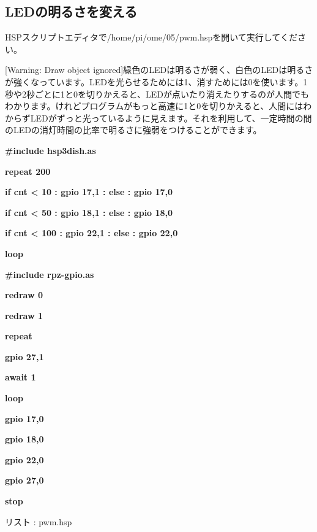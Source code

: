 \documentclass[a4paper,dvipdfmx]{jarticle}
\newcounter{List}
\renewcommand\theList{\arabic{List}}
\begin{document}
\clearpage\subsection{LEDの明るさを変える}
{\mdseries
HSPスクリプトエディタで/home/pi/ome/05/pwm.hspを開いて実行してください。}

[Warning: Draw object
ignored]緑色のLEDは明るさが弱く、白色のLEDは明るさが強くなっています。LEDを光らせるためには1、消すためには0を使います。1秒や2秒ごとに1と0を切りかえると、LEDが点いたり消えたりするのが人間でもわかります。けれどプログラムがもっと高速に1と0を切りかえると、人間にはわからずLEDがずっと光っているように見えます。それを利用して、一定時間の間のLEDの消灯時間の比率で明るさに強弱をつけることができます。

\centering
\begin{minipage}{17.006cm}
{\ttfamily\bfseries
\#include {\textquotedbl}hsp3dish.as{\textquotedbl}}

\begin{minipage}{17.006cm}
{\ttfamily\bfseries
repeat 200}

{\ttfamily\bfseries
if cnt {\textless} 10 : gpio 17,1 : else : gpio 17,0}

{\ttfamily\bfseries
if cnt {\textless} 50 : gpio 18,1 : else : gpio 18,0}

{\ttfamily\bfseries
if cnt {\textless} 100 : gpio 22,1 : else : gpio 22,0}

{\ttfamily\bfseries
loop}
\end{minipage}{\ttfamily\bfseries
\#include {\textquotedbl}rpz-gpio.as{\textquotedbl}}


\bigskip

{\ttfamily\bfseries
redraw 0}

{\ttfamily\bfseries
redraw 1}


\bigskip

{\ttfamily\bfseries
repeat}

{\ttfamily\bfseries
gpio 27,1}

{\ttfamily\bfseries
await 1}

{\ttfamily\bfseries
loop}


\bigskip

{\ttfamily\bfseries
gpio 17,0}

{\ttfamily\bfseries
gpio 18,0}

{\ttfamily\bfseries
gpio 22,0}

{\ttfamily\bfseries
gpio 27,0}

{\ttfamily\bfseries
stop}

{\mdseries
リスト \stepcounter{List}{\theList}: pwm.hsp}
\end{minipage}
\end{document}
